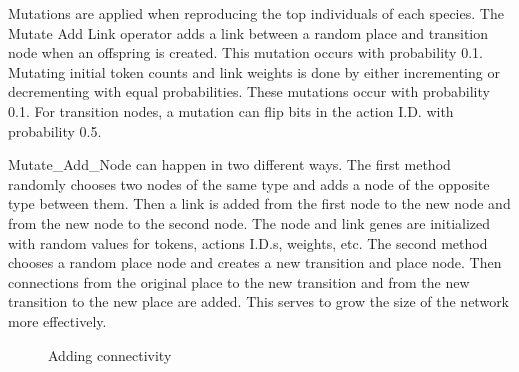 \documentclass[12pt,a4paper,twocolumn]{article}
\begin{document}
Mutations are applied when reproducing the top individuals of each species. The Mutate Add Link operator adds a link between a random place and transition node when an offspring is created. This mutation occurs with probability 0.1. Mutating initial token counts and link weights is done by either incrementing or decrementing with equal probabilities. These mutations occur with probability 0.1. For transition nodes, a mutation can flip bits in the action I.D. with probability 0.5. 

Mutate{\_}Add{\_}Node can happen in two different ways. The first method randomly chooses two nodes of the same type and adds a node of the opposite type between them. Then a link is added from the first node to the new node and from the new node to the second node. The node and link genes are initialized with random values for tokens, actions I.D.s, weights, etc. The second method chooses a random place node and creates a new transition and place node. Then connections from the original place to the new transition and from the new transition to the new place are added. This serves to grow the size of the network more effectively.

  \begin{figure}

\caption{Adding connectivity}
\end{figure}
\end{document}
